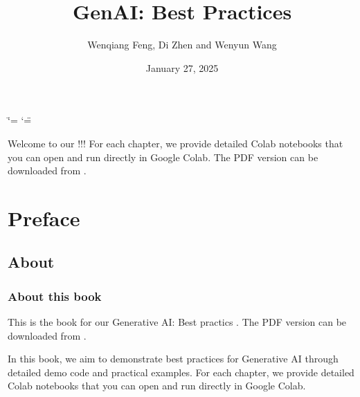 \documentclass[letterpaper,11pt,english]{sphinxmanual}
\title{GenAI: Best Practices}
\date{January 27, 2025}
\author{Wenqiang Feng, Di Zhen and Wenyun Wang}
\begin{document}
\ifdefined\shorthandoff
  \ifnum\catcode`\=\string=\active\shorthandoff{=}\fi
  \ifnum\catcode`\"=\active{}\fi
\fi

\pagestyle{empty}
\sphinxmaketitle
\pagestyle{plain}
\sphinxtableofcontents
\pagestyle{normal}
\label{\detokenize{index::doc}}\label{\detokenize{index:index}}\begin{quote}

\begin{figure}[htbp]
\centering

\noindent{}
\end{figure}
\end{quote}

\sphinxAtStartPar
Welcome to our !!! For each chapter, we provide detailed
Colab notebooks  that you can open and run directly in Google Colab.
The PDF version can be downloaded from .



\sphinxstepscope


\chapter{Preface}
\label{\detokenize{preface:id1}}\label{\detokenize{preface::doc}}

\section{About}
\label{\detokenize{preface:about}}

\subsection{About this book}
\label{\detokenize{preface:about-this-book}}
\sphinxAtStartPar
This is the book for our Generative AI: Best practics .
The PDF version can be downloaded from .

\sphinxAtStartPar
In this book, we aim to demonstrate best practices for Generative AI
through detailed demo code and practical examples. For each chapter, we provide detailed
Colab notebooks  that you can open and run directly in Google Colab.
\end{document}
